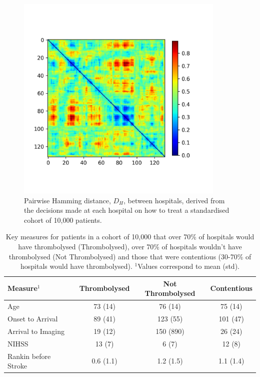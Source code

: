 \documentclass[12pt,a4paper, pdftex]{elsarticle}
\begin{document}
\begin{figure}[h!]
\centering
\includegraphics[width=10cm]{figures/cohort_distance.jpg}
\caption{Pairwise Hamming distance, $D_H$, between hospitals, derived from the decisions made at each hospital on how to treat a standardised cohort of 10,000 patients.}
\label{fig:contentious}
\end{figure}

    \begin{table}[h]
        \centering
        \begin{tabular}{|l|c|c|c|}
        \hline
        {\bf Measure$^1$} & {\bf Thrombolysed} & {\bf Not Thrombolysed} & {\bf Contentious}  \\
        \hline
        Age & 73 (14) & 76 (14) & 75 (14) \\
        Onset to Arrival & 89 (41) & 123 (55)  & 101 (47) \\
        Arrival to Imaging & 19 (12) & 150 (890)  & 26 (24) \\
        NIHSS & 13 (7) & 6 (7)  & 12 (8) \\
        Rankin before Stroke & 0.6 (1.1)  & 1.2 (1.5) & 1.1 (1.4) \\
        \hline
        \end{tabular}
        \caption{Key measures for patients in a cohort of 10,000 that over 70\% of hospitals would have thrombolysed (Thrombolysed), over 70\% of hospitals wouldn't have thrombolysed (Not Thrombolysed) and those that were contentious (30-70\% of hospitals would have thrombolysed). $^1$Values correspond to mean (std).}
        \label{tab:3}
    \end{table}
\end{document}
